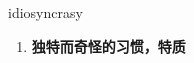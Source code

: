 
\begin{frame}
{\huge idiosyncrasy}
\begin{center}
\begin{enumerate}\Large
  \item \textbf{独特而奇怪的习惯，特质}
\end{enumerate}
\end{center}
\end{frame}
